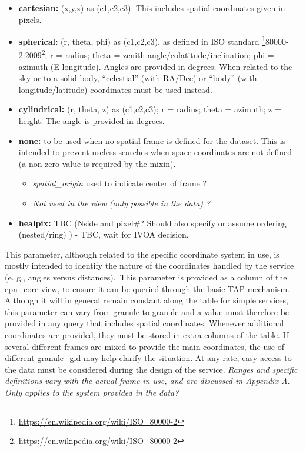 \documentclass[11pt,a4paper]{ivoa}
\begin{document}
\begin{itemize}
\item \textbf{cartesian:} (x,y,z) as (c1,c2,c3). This includes spatial coordinates given in pixels.
\item \textbf{spherical:} (r, theta, phi) as (c1,c2,c3), as defined in ISO standard \footnote{\url{https://en.wikipedia.org/wiki/ISO\_80000-2}}80000-2:2009\footnote{\url{https://en.wikipedia.org/wiki/ISO\_80000-2}}; r = radius; theta = zenith angle/colatitude/inclination; phi = azimuth (E longitude). Angles are provided in degrees. When related to the sky or to a solid body, ``celestial'' (with RA/Dec) or ``body'' (with longitude/latitude) coordinates must be used instead.
\item \textbf{cylindrical:} (r, theta, z) as (c1,c2,c3); r = radius; theta = azimuth; z = height. The angle is provided in degrees.
\item \textbf{none:} to be used when no spatial frame is defined for the dataset. This is intended to prevent useless searches when space coordinates are not defined (a non-zero value is required by the mixin).\begin{itemize}
\item \emph{spatial\_origin} used to indicate center of frame ?
\item \emph{Not used in the view (only possible in the data) ?}
\end{itemize}


\item \textbf{healpix:} TBC (Nside and pixel\#? Should also specify or assume ordering (nested/ring) ) - TBC, wait for IVOA decision.
\end{itemize}

This parameter, although related to the specific coordinate system in use, is mostly intended to identify the nature of the coordinates handled by the service (e. g., angles versus distances). This parameter is provided as a column of the epn\_core view, to ensure it can be queried through the basic TAP mechanism. Although it will in general remain constant along the table for simple services, this parameter can vary from granule to granule and a value must therefore be provided in any query that includes spatial coordinates. Whenever additional coordinates are provided, they must be stored in extra columns of the table. If several different frames are mixed to provide the main coordinates, the use of different granule\_gid may help clarify the situation. At any rate, easy access to the data must be considered during the design of the service. \emph{Ranges and specific definitions vary with the actual frame in use, and are discussed in Appendix A. - Only applies to the system provided in the data?} 
\end{document}

